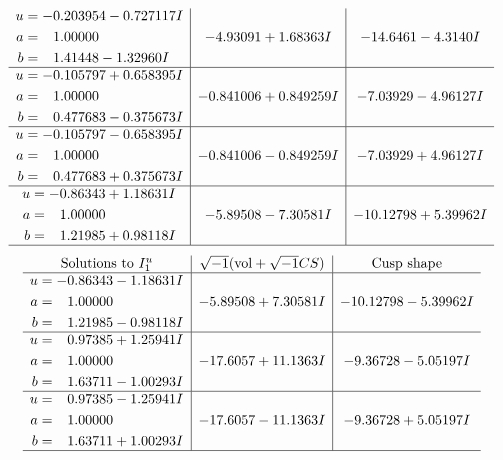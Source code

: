 \documentclass[1p]{elsarticle_modified}
\theoremstyle{definition}
\newcommand{\I}{\sqrt{-1}}
\begin{document}
$$\begin{array}{c|c|c}
\begin{aligned}
u &= -0.203954 - 0.727117 I \\
a &= \phantom{-}1.00000\phantom{ +0.000000I} \\
b &= \phantom{-}1.41448 - 1.32960 I\end{aligned}
 & -4.93091 + 1.68363 I & -14.6461 - 4.3140 I \\ \hline\begin{aligned}
u &= -0.105797 + 0.658395 I \\
a &= \phantom{-}1.00000\phantom{ +0.000000I} \\
b &= \phantom{-}0.477683 - 0.375673 I\end{aligned}
 & -0.841006 + 0.849259 I & -7.03929 - 4.96127 I \\ \hline\begin{aligned}
u &= -0.105797 - 0.658395 I \\
a &= \phantom{-}1.00000\phantom{ +0.000000I} \\
b &= \phantom{-}0.477683 + 0.375673 I\end{aligned}
 & -0.841006 - 0.849259 I & -7.03929 + 4.96127 I \\ \hline\begin{aligned}
u &= -0.86343 + 1.18631 I \\
a &= \phantom{-}1.00000\phantom{ +0.000000I} \\
b &= \phantom{-}1.21985 + 0.98118 I\end{aligned}
 & -5.89508 - 7.30581 I & -10.12798 + 5.39962 I\\
 \hline 
 \end{array}$$\newpage$$\begin{array}{c|c|c}  
\text{Solutions to }I^u_{1}& \I (\text{vol} + \sqrt{-1}CS) & \text{Cusp shape}\\
 \hline 
\begin{aligned}
u &= -0.86343 - 1.18631 I \\
a &= \phantom{-}1.00000\phantom{ +0.000000I} \\
b &= \phantom{-}1.21985 - 0.98118 I\end{aligned}
 & -5.89508 + 7.30581 I & -10.12798 - 5.39962 I \\ \hline\begin{aligned}
u &= \phantom{-}0.97385 + 1.25941 I \\
a &= \phantom{-}1.00000\phantom{ +0.000000I} \\
b &= \phantom{-}1.63711 - 1.00293 I\end{aligned}
 & -17.6057 + 11.1363 I & -9.36728 - 5.05197 I \\ \hline\begin{aligned}
u &= \phantom{-}0.97385 - 1.25941 I \\
a &= \phantom{-}1.00000\phantom{ +0.000000I} \\
b &= \phantom{-}1.63711 + 1.00293 I\end{aligned}
 & -17.6057 - 11.1363 I & -9.36728 + 5.05197 I\\
 \hline 
 \end{array}$$\newpage\newpage\renewcommand{\arraystretch}{1}
\end{document}
